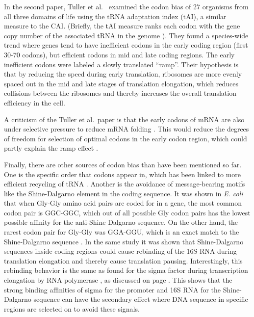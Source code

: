 In the second paper, Tuller et al.\ \cite{tuller_evolutionarily_2010} examined
the codon bias of 27 organisms from all three domains of life using the tRNA
adaptation index (tAI), a similar measure to the CAI. (Briefly, the tAI measure
ranks each codon with the gene copy number of the associated tRNA in the genome
\cite{tuller_evolutionarily_2010}). They found a species-wide trend where genes
tend to have inefficient codons in the early coding region (first 30-70
codons), but efficient codons in mid and late coding regions. The early
inefficient codons were labeled a slowly translated ``ramp''. Their hypothesis
is that by reducing the speed during early translation, ribosomes are more
evenly spaced out in the mid and late stages of translation elongation, which
reduces collisions between the ribosomes and thereby increases the overall
translation efficiency in the cell.

A criticism of the Tuller et al.\ paper is that the early codons of mRNA are
also under selective pressure to reduce mRNA folding \cite{gu_universal_2010}.
This would reduce the degrees of freedom for selection of optimal codons in the
early codon region, which could partly explain the ramp effect
\cite{plotkin_synonymous_2011}.

Finally, there are other sources of codon bias than have been mentioned so far.
One is the specific order that codons appear in, which has been linked to more
efficient recycling of tRNA \cite{cannarozzi_role_2010}. Another is the
avoidance of message-bearing motifs like the Shine-Dalgarno element in the
coding sequence. It was shown in \textit{E. coli} that when Gly-Gly amino acid
pairs are coded for in a gene, the most common codon pair is GGC-GGC, which out
of all possible Gly codon pairs has the lowest possible affinity for the
anti-Shine Dalgarno sequence. On the other hand, the rarest codon pair for
Gly-Gly was GGA-GGU, which is an exact match to the Shine-Dalgarno sequence
\cite{li_anti-shine-dalgarno_2012}. In the same study it was shown that
Shine-Dalgarno sequences inside coding regions could cause rebinding of the 16S
RNA during translation elongation and thereby cause translation pausing.
Interestingly, this rebinding behavior is the same as found for the sigma
factor during transcription elongation by RNA polymerase
\cite{mooney_sigma_2005}, as discussed on page \pageref{sigma_rebinding}. This
shows that the strong binding affinities of sigma for the promoter and 16S RNA
for the Shine-Dalgarno sequence can have the secondary effect where DNA
sequence in specific regions are selected on to avoid these signals.
